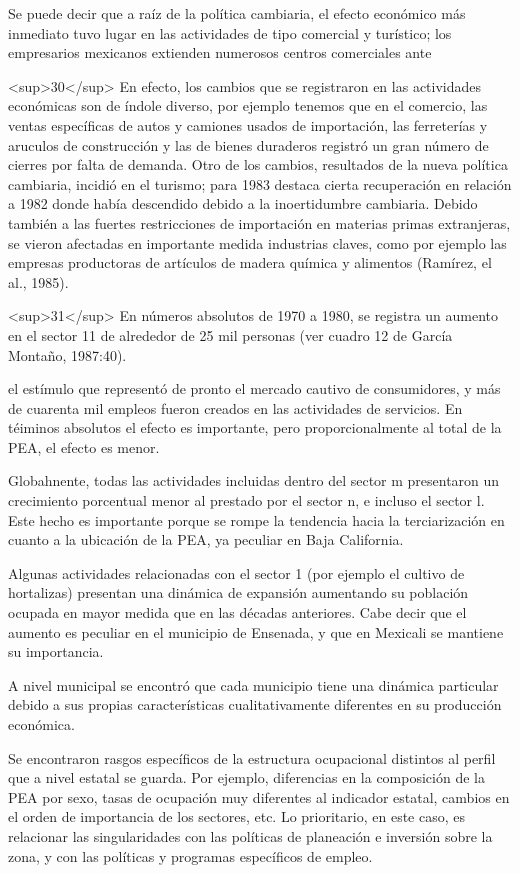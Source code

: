 \documentclass{article}
\begin{document}
Se puede decir que a raíz de la política cambiaria, el efecto económico más inmediato tuvo lugar en las actividades de tipo comercial y turístico; los empresarios mexicanos extienden numerosos centros comerciales ante

<sup>30</sup> En efecto, los cambios que se registraron en las actividades económicas son de índole diverso, por ejemplo tenemos que en el comercio, las ventas específicas de autos y camiones usados de importación, las ferreterías y aruculos de construcción y las de bienes duraderos registró un gran número de cierres por falta de demanda. Otro de los cambios, resultados de la nueva política cambiaria, incidió en el turismo; para 1983 destaca cierta recuperación en relación a 1982 donde había descendido debido a la inoertidumbre cambiaria. Debido también a las fuertes restricciones de importación en materias primas extranjeras, se vieron afectadas en importante medida industrias claves, como por ejemplo las empresas productoras de artículos de madera química y alimentos (Ramírez, el al., 1985).

<sup>31</sup> En números absolutos de 1970 a 1980, se registra un aumento en el sector 11 de alrededor de 25 mil personas (ver cuadro 12 de García Montaño, 1987:40).

el estímulo que representó de pronto el mercado cautivo de consumidores, y más de cuarenta mil empleos fueron creados en las actividades de servicios. En téiminos absolutos el efecto es importante, pero proporcionalmente al total de la PEA, el efecto es menor.

Globahnente, todas las actividades incluidas dentro del sector m presentaron un crecimiento porcentual menor al prestado por el sector n, e incluso el sector l. Este hecho es importante porque se rompe la tendencia hacia la terciarización en cuanto a la ubicación de la PEA, ya peculiar en Baja California.

Algunas actividades relacionadas con el sector 1 (por ejemplo el cultivo de hortalizas) presentan una dinámica de expansión aumentando su población ocupada en mayor medida que en las décadas anteriores. Cabe decir que el aumento es peculiar en el municipio de Ensenada, y que en Mexicali se mantiene su importancia.

A nivel municipal se encontró que cada municipio tiene una dinámica particular debido a sus propias características cualitativamente diferentes en su producción económica.

Se encontraron rasgos específicos de la estructura ocupacional distintos al perfil que a nivel estatal se guarda. Por ejemplo, diferencias en la composición de la PEA por sexo, tasas de ocupación muy diferentes al indicador estatal, cambios en el orden de importancia de los sectores, etc. Lo prioritario, en este caso, es relacionar las singularidades con las políticas de planeación e inversión sobre la zona, y con las políticas y programas específicos de empleo.
\end{document}
